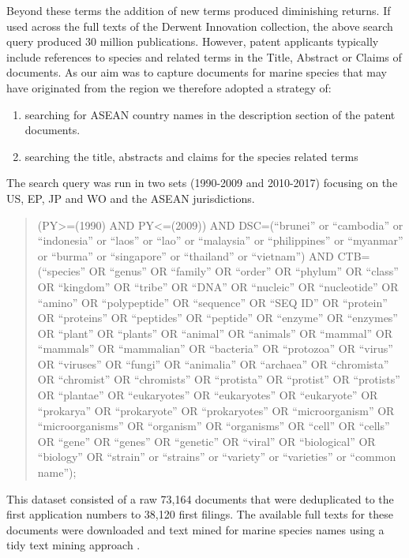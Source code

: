 \documentclass[]{book}
\providecommand{\tightlist}{%
  \setlength{\itemsep}{0pt}\setlength{\parskip}{0pt}}
\theoremstyle{definition}
\theoremstyle{definition}
\theoremstyle{definition}
\theoremstyle{remark}
\begin{document}
Beyond these terms the addition of new terms produced diminishing
returns. If used across the full texts of the Derwent Innovation
collection, the above search query produced 30 million publications.
However, patent applicants typically include references to species and
related terms in the Title, Abstract or Claims of documents. As our aim
was to capture documents for marine species that may have originated
from the region we therefore adopted a strategy of:

\begin{enumerate}
\def\labelenumi{\alph{enumi})}
\tightlist
\item
  searching for ASEAN country names in the description section of the
  patent documents.
\item
  searching the title, abstracts and claims for the species related
  terms
\end{enumerate}

The search query was run in two sets (1990-2009 and 2010-2017) focusing
on the US, EP, JP and WO and the ASEAN jurisdictions.

\begin{quote}
(PY\textgreater{}=(1990) AND PY\textless{}=(2009)) AND DSC=(``brunei''
or ``cambodia'' or ``indonesia'' or ``laos'' or ``lao'' or ``malaysia''
or ``philippines'' or ``myanmar'' or ``burma'' or ``singapore'' or
``thailand'' or ``vietnam'') AND CTB=(``species'' OR ``genus'' OR
``family'' OR ``order'' OR ``phylum'' OR ``class'' OR ``kingdom'' OR
``tribe'' OR ``DNA'' OR ``nucleic'' OR ``nucleotide'' OR ``amino'' OR
``polypeptide'' OR ``sequence'' OR ``SEQ ID'' OR ``protein'' OR
``proteins'' OR ``peptides'' OR ``peptide'' OR ``enzyme'' OR ``enzymes''
OR ``plant'' OR ``plants'' OR ``animal'' OR ``animals'' OR ``mammal'' OR
``mammals'' OR ``mammalian'' OR ``bacteria'' OR ``protozoa'' OR
``virus'' OR ``viruses'' OR ``fungi'' OR ``animalia'' OR ``archaea'' OR
``chromista'' OR ``chromist'' OR ``chromists'' OR ``protista'' OR
``protist'' OR ``protists'' OR ``plantae'' OR ``eukaryotes'' OR
``eukaryotes'' OR ``eukaryote'' OR ``prokarya'' OR ``prokaryote'' OR
``prokaryotes'' OR ``microorganism'' OR ``microorganisms'' OR
``organism'' OR ``organisms'' OR ``cell'' OR ``cells'' OR ``gene'' OR
``genes'' OR ``genetic'' OR ``viral'' OR ``biological'' OR ``biology''
OR ``strain'' or ``strains'' or ``variety'' or ``varieties'' or ``common
name'');
\end{quote}

This dataset consisted of a raw 73,164 documents that were deduplicated
to the first application numbers to 38,120 first filings. The available
full texts for these documents were downloaded and text mined for marine
species names using a tidy text mining approach \citep{R-tidytext}.
\end{document}
